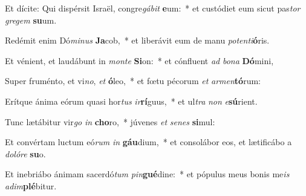 \item Et dícite: Qui dispérsit Israël, congre\textit{gá}\textit{bit} \textbf{e}um:~* et custódiet eum sicut pas\textit{tor} \textit{gre}\textit{gem} \textbf{su}um.
\item Redémit enim Dó\textit{mi}\textit{nus} \textbf{Ja}cob,~* et liberávit eum de manu \textit{pot}\textit{en}\textit{ti}\textbf{ó}ris.
\item Et vénient, et laudábunt in \textit{mon}\textit{te} \textbf{Si}on:~* et cónfluent \textit{ad} \textit{bo}\textit{na} \textbf{Dó}mini,
\item Super fruménto, et vi\textit{no}, \textit{et} \textbf{ó}leo,~* et fœtu pécorum \textit{et} \textit{ar}\textit{men}\textbf{tó}rum:
\item Erítque ánima eórum quasi hor\textit{tus} \textit{ir}\textbf{rí}guus,~* et ul\textit{tra} \textit{non} \textit{e}\textbf{sú}rient.
\item Tunc lætábitur vir\textit{go} \textit{in} \textbf{cho}ro,~* júvenes \textit{et} \textit{se}\textit{nes} \textbf{si}mul:
\item Et convértam luctum eó\textit{rum} \textit{in} \textbf{gáu}dium,~* et consolábor eos, et lætificábo a \textit{do}\textit{ló}\textit{re} \textbf{su}o.
\item Et inebriábo ánimam sacerdó\textit{tum} \textit{pin}\textbf{gué}dine:~* et pópulus meus bonis me\textit{is} \textit{ad}\textit{im}\textbf{plé}bitur.

